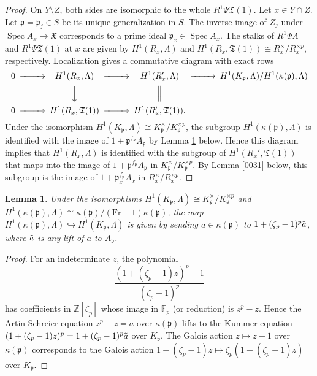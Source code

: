 \documentclass{amsart}
\newtheorem{Lem}[Thm]{Lemma}
\theoremstyle{remark}
\numberwithin{equation}{section}
\newcommand{\into}{\hookrightarrow}
\newcommand{\Z}{\mathbb{Z}}
\newcommand{\F}{\mathbb{F}}
\newcommand{\ideal}[1]{\mathfrak{#1}}
\newcommand{\Frob}{\mathrm{Fr}}
\DeclareMathOperator{\Spec}{Spec}
\begin{document}
\begin{proof}
	On $Y \setminus Z$, both sides are isomorphic to the whole $R^{1} \Psi \mathfrak{T}(1)$.
	Let $x \in Y \cap Z$.
	Let $\ideal{p} = \ideal{p}_{j} \in S$ be its unique generalization in $S$.
	The inverse image of $Z_{j}$ under $\Spec A_{x} \to \mathfrak{X}$
	corresponds to a prime ideal $\ideal{p}_{x} \in \Spec A_{x}$.
	The stalks of $R^{1} \Psi \Lambda$ and $R^{1} \Psi \mathfrak{T}(1)$ at $x$ are given by
	$H^{1}(R_{x}, \Lambda)$ and
	$H^{1}(R_{x}, \mathfrak{T}(1)) \cong R_{x}^{\times} / R_{x}^{\times p}$,
	respectively.
	Localization gives a commutative diagram with exact rows
		\[
			\begin{CD}
					0
				@>>>
					H^{1}(R_{x}, \Lambda)
				@>>>
					H^{1}(R_{x}', \Lambda)
				@>>>
						H^{1}(K_{\ideal{p}}, \Lambda)
					/
						H^{1}(\kappa(\ideal{p}), \Lambda)
				\\
				@. @VVV @| @.
				\\
					0
				@>>>
					H^{1}(R_{x}, \mathfrak{T}(1))
				@>>>
					H^{1}(R_{x}', \mathfrak{T}(1)).
				@.
			\end{CD}
		\]
	Under the isomorphism
	$H^{1}(K_{\ideal{p}}, \Lambda) \cong K_{\ideal{p}}^{\times} / K_{\ideal{p}}^{\times p}$,
	the subgroup $H^{1}(\kappa(\ideal{p}), \Lambda)$ is identified with
	the image of $1 + \ideal{p}^{f_{\ideal{p}}} A_{\ideal{p}}$
	by Lemma \ref{0059} below.
	Hence this diagram implies that $H^{1}(R_{x}, \Lambda)$ is identified with
	the subgroup of $H^{1}(R_{x}', \mathfrak{T}(1))$ that maps into
	the image of $1 + \ideal{p}^{f_{\ideal{p}}} A_{\ideal{p}}$
	in $K_{\ideal{p}}^{\times} / K_{\ideal{p}}^{\times p}$.
	By Lemma \ref{0031} below, this subgroup is the image of
	$1 + \ideal{p}_{x}^{f_{\ideal{p}}} A_{x}$ in $R_{x}^{\times} / R_{x}^{\times p}$.
\end{proof}

\begin{Lem} \label{0059}
	Under the isomorphisms
	$H^{1}(K_{\ideal{p}}, \Lambda) \cong K_{\ideal{p}}^{\times} / K_{\ideal{p}}^{\times p}$
	and $H^{1}(\kappa(\ideal{p}), \Lambda) \cong \kappa(\ideal{p}) / (\Frob - 1) \kappa(\ideal{p})$,
	the map $H^{1}(\kappa(\ideal{p}), \Lambda) \into H^{1}(K_{\ideal{p}}, \Lambda)$
	is given by sending $a \in \kappa(\ideal{p})$
	to $1 + (\zeta_{p} - 1)^{p} \Tilde{a}$,
	where $\Tilde{a}$ is any lift of $a$ to $A_{\ideal{p}}$.
\end{Lem}

\begin{proof}
	For an indeterminate $z$,
	the polynomial
		\[
			\frac{
				(1 + (\zeta_{p} - 1) z)^{p} - 1
			}{
				(\zeta_{p} - 1)^{p}
			}
		\]
	has coefficients in $\Z[\zeta_{p}]$
	whose image in $\F_{p}$ (or reduction) is $z^{p} - z$.
	Hence the Artin-Schreier equation $z^{p} - z = a$ over $\kappa(\ideal{p})$
	lifts to the Kummer equation
	$(1 + (\zeta_{p} - 1) z)^{p} = 1 + (\zeta_{p} - 1)^{p} \Tilde{a}$ over $K_{\ideal{p}}$.
	The Galois action $z \mapsto z + 1$ over $\kappa(\ideal{p})$ corresponds to
	the Galois action $1 + (\zeta_{p} - 1) z \mapsto \zeta_{p} (1 + (\zeta_{p} - 1) z)$ over $K_{\ideal{p}}$.
\end{proof}
\end{document}
